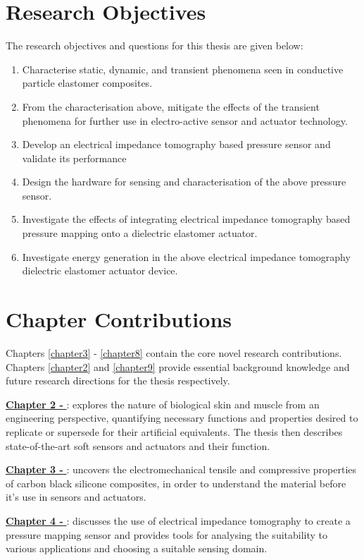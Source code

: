 \section{Research Objectives}
The research objectives and questions for this thesis are given below:
\begin{enumerate}
	\item Characterise static, dynamic, and transient phenomena seen in conductive particle elastomer composites.
	\item From the characterisation above, mitigate the effects of the transient phenomena for further use in electro-active sensor and actuator technology.
	\item Develop an electrical impedance tomography based pressure sensor and validate its performance
	\item Design the hardware for sensing and characterisation of the above pressure sensor.
	\item Investigate the effects of integrating electrical impedance tomography based pressure mapping onto a dielectric elastomer actuator.
	\item Investigate energy generation in the above electrical impedance tomography dielectric elastomer actuator device.
\end{enumerate}



\section{Chapter Contributions}
Chapters \ref{chapter3} - \ref{chapter8} contain the core novel research contributions. Chapters \ref{chapter2} and \ref{chapter9} provide essential background knowledge and future research directions for the thesis respectively.

\hyperref[chapter2]{\textbf{Chapter 2 - \chapiiname}}: explores the nature of biological skin and muscle from an engineering perspective, quantifying necessary functions and properties desired to replicate or supersede for their artificial equivalents. The thesis then describes state-of-the-art soft sensors and actuators and their function.

\hyperref[chapter3]{\textbf{Chapter 3 - \chapiiiname}}: uncovers the electromechanical tensile and compressive properties of carbon black silicone composites, in order to understand the material before it's use in sensors and actuators.

\hyperref[chapter4]{\textbf{Chapter 4 - \chapivname}}: discusses the use of electrical impedance tomography to create a pressure mapping sensor and provides tools for analysing the suitability to various applications and choosing a suitable sensing domain.

